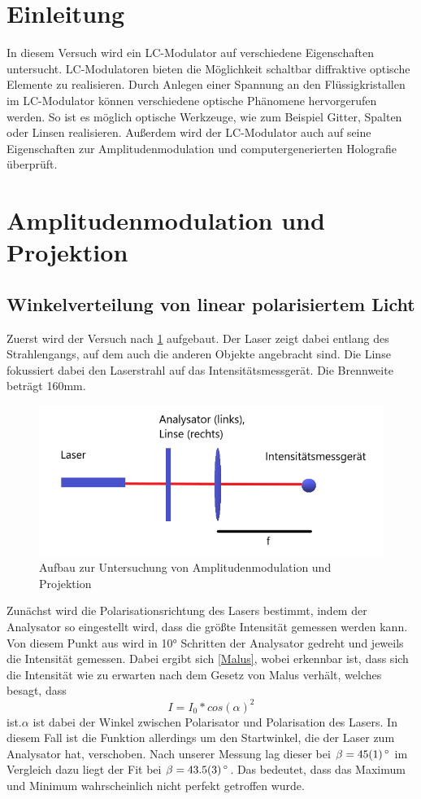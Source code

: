 \section{Einleitung}
In diesem Versuch wird ein LC-Modulator auf verschiedene Eigenschaften untersucht. LC-Modulatoren bieten die Möglichkeit schaltbar diffraktive optische Elemente zu realisieren. Durch Anlegen einer Spannung an den Flüssigkristallen im LC-Modulator können verschiedene optische Phänomene hervorgerufen werden. So ist es möglich optische Werkzeuge, wie zum Beispiel Gitter, Spalten oder Linsen realisieren. Außerdem wird der LC-Modulator auch auf seine Eigenschaften zur Amplitudenmodulation und computergenerierten Holografie überprüft.
\section{Amplitudenmodulation und Projektion}
\subsection{Winkelverteilung von linear polarisiertem Licht}
Zuerst wird der Versuch nach \cref{411} aufgebaut. Der Laser zeigt dabei entlang des Strahlengangs, auf dem auch die anderen Objekte angebracht sind. Die Linse fokussiert dabei den Laserstrahl auf das Intensitätsmessgerät.
Die Brennweite beträgt 160mm. 

\begin{figure}[h!]
	\centering
	\includegraphics[scale=1]{4.1.1-Aufbau.png}
	\caption{Aufbau zur Untersuchung von Amplitudenmodulation und Projektion}
	\label{411}
\end{figure}

Zunächst wird die Polarisationsrichtung des Lasers bestimmt, indem der Analysator so eingestellt wird, dass die größte Intensität gemessen werden kann. Von diesem Punkt aus wird in 10° Schritten der Analysator gedreht und jeweils die Intensität gemessen. Dabei ergibt sich \cref{Malus}, wobei erkennbar ist, dass  sich die Intensität wie zu erwarten nach dem Gesetz von Malus verhält, welches besagt, dass 
\begin{equation}
	I = I_{0}*cos(\alpha)^{2}
\end{equation}
ist.$\alpha$ ist dabei der Winkel zwischen Polarisator und Polarisation des Lasers. In diesem Fall ist die Funktion allerdings um den Startwinkel, die der Laser zum Analysator hat, verschoben.
Nach unserer Messung lag dieser bei $\beta = \SI{45 \pm 1}{^\circ}$ im Vergleich dazu liegt der Fit bei $\beta = \SI{43,5 \pm 0,3}{^\circ}$. Das bedeutet, dass das Maximum und Minimum wahrscheinlich nicht perfekt getroffen wurde.


